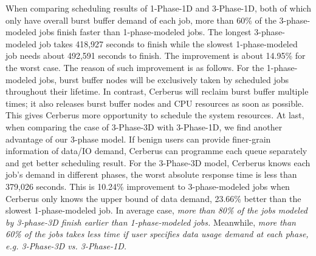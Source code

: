 When comparing scheduling results of 1-Phase-1D and 3-Phase-1D,
both of which only have overall burst buffer demand of each job,
more than 60\% of the 3-phase-modeled jobs finish faster than 1-phase-modeled jobs.
The longest 3-phase-modeled job takes 418,927 seconds to finish
while the slowest 1-phase-modeled job needs about 492,591 seconds to finish.
The improvement is about 14.95\% for the worst case.
The reason of such improvement is as follows.
For the 1-phase-modeled jobs, burst buffer nodes will be exclusively
taken by scheduled jobs throughout their lifetime.
In contrast, Cerberus will reclaim burst buffer multiple times;
it also releases burst buffer nodes and CPU resources as soon as possible.
This gives Cerberus more opportunity to schedule the system resources.
At last, when comparing the case of 3-Phase-3D with 3-Phase-1D,
we find another advantage of our 3-phase model.
If benign users can provide finer-grain information of data/IO demand,
Cerberus can programme each queue separately and get better scheduling result.
For the 3-Phase-3D model,
Cerberus knows each job's demand in different phases,
the worst absolute response time is less than 379,026 seconds.
This is 10.24\% improvement to 3-phase-modeled jobs
when Cerberus only knows the upper bound of data demand,
23.66\% better than the slowest 1-phase-modeled job.
In average case, \textit{more than 80\% of the jobs 
modeled by 3-phase-3D finish earlier than 1-phase-modeled jobs.}
Meanwhile, \textit{more than 60\% of the jobs takes less time if user 
specifies data usage demand at each phase, e.g. 3-Phase-3D vs. 3-Phase-1D.}





